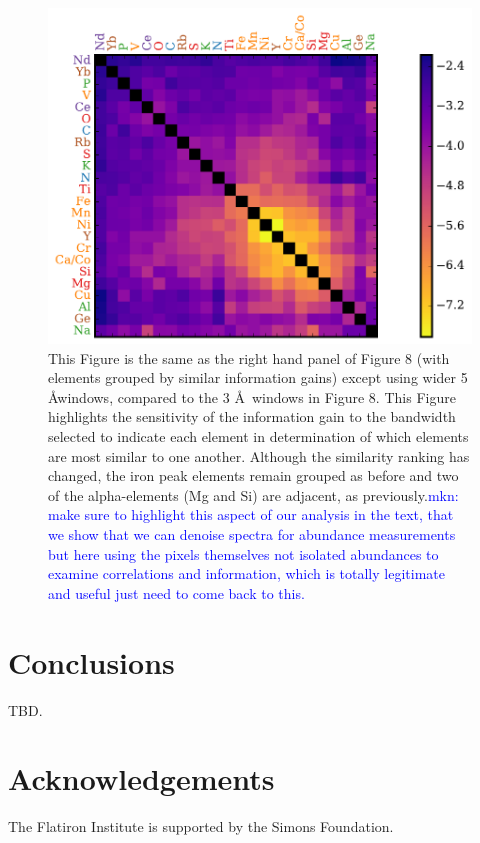 \documentclass[a4paper,fleqn,usenatbib]{mnras}
\begin{document}
\begin{figure}
	\includegraphics[width=\columnwidth]{apogee_centers_final_29502_spc_sorted_inf_gains_abs_min_tot_dist.pdf}
    \caption{This Figure is the same as the right hand panel of Figure 8 (with elements grouped by similar information gains) except using wider 5 \AA windows, compared to the 3 \AA\ windows in Figure 8.  This Figure highlights the sensitivity of the information gain to the bandwidth selected to indicate each element in determination of which elements are most similar to one another. Although the similarity ranking has changed, the iron peak elements remain grouped as before and two of the alpha-elements (Mg and Si) are adjacent, as previously.\textcolor{blue}{mkn: make sure to highlight this aspect of our analysis in the text, that we show that we can denoise spectra for abundance measurements but here using the pixels themselves not isolated abundances to examine correlations and information, which is totally legitimate and useful just need to come back to this. }}
    \label{fig:single_element_errs_wide}
\end{figure}



\section{Conclusions}

TBD.


\section*{Acknowledgements}

The Flatiron Institute is supported by the Simons Foundation.


%



\bsp	%
\label{lastpage}
\end{document}
